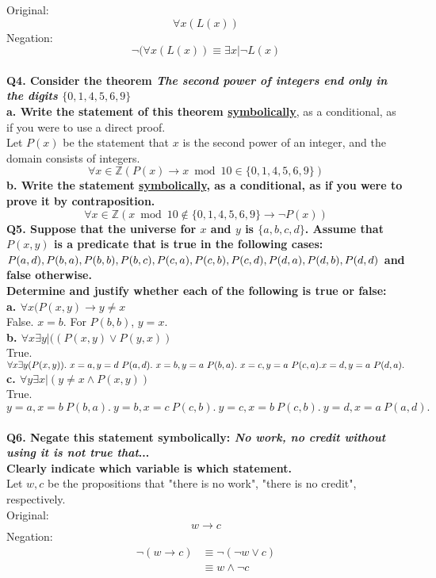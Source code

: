 \documentclass[letterpaper,12pt]{article}
\begin{document}
Original: $$\forall x (L(x))$$
Negation: $$\neg(\forall x (L(x)) \equiv \exists x | \neg L(x)$$ 
\\
\textbf{Q4. Consider the theorem \textit{The second power of integers end only in the digits} $\{0,1,4,5,6,9\}$} \\
\textbf{a. Write the statement of this theorem \underline{symbolically}}, as a conditional, as if you were to use a direct proof. \\
Let $P(x)$ be the statement that $x$ is the second power of an integer, and the domain consists of integers.
$$\forall x \in \mathbb{Z} (P(x) \rightarrow x \bmod{10} \in \{0,1,4,5,6,9\})$$
\textbf{b. Write the statement \underline{symbolically}, as a conditional, as if you were to prove it by contraposition.} 
$$\forall x \in \mathbb{Z} (x \bmod{10} \notin \{0,1,4,5,6,9\} \rightarrow \neg P(x))$$
\textbf{Q5. Suppose that the universe for $x$ and $y$ is $\{a,b,c,d\}$. Assume that $P(x,y)$ is a predicate that is true in the following cases: $P(a,d), P(b,a), P(b,b), P(b,c), P(c,a), P(c,b), \\ P(c,d), P(d,a), P(d,b), P(d,d)$ and false otherwise. \\
Determine and justify whether each of the following is true or false:} \\
\textbf{a. $\forall x (P(x,y) \rightarrow y \neq x$} \\
False. $x=b$. For $P(b,b)$, $y=x$. \\
\textbf{b. $\forall x \exists y|((P(x,y) \lor P(y,x))$} \\
True. $\forall x \exists y (P(x,y)). \ x=a, y=d \ P(a,d). \ x=b, y = a \ P(b,a). \ x=c, y=a \ P(c,a). \\ x=d, y=a \ P(d,a).$ \\
\textbf{c. $\forall y \exists x|(y \neq x \land P(x,y))$} \\
True. $y=a, x=b \ P(b,a). \ y=b, x=c \ P(c,b). \ y=c, x=b \ P(c,b). \ y=d, x=a \ P(a,d).$ \\
\\
\textbf{Q6. Negate this statement symbolically: \textit{No work, no credit without using it is not true that}... \\
Clearly indicate which variable is which statement.} \\
Let $w, c$ be the propositions that "there is no work", "there is no credit", respectively. \\
Original: $$w \rightarrow c$$
Negation: 
\begin{align*}
    \neg ( w \rightarrow c) &\equiv \neg (\neg w \lor c) \\
                            &\equiv w \land \neg c
\end{align*}
\end{document}
